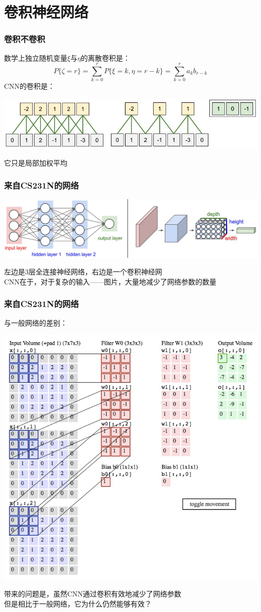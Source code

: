 \documentclass[24pt]{beamer}
\begin{document}
\section{卷积神经网络}
\begin{frame}
\frametitle{卷积不卷积}
数学上独立随机变量$\xi$与$\eta$的离散卷积是：
\[ P\{\zeta = r\} = \sum_{k = 0}^r P\{ \xi=k, \eta=r-k \} = \sum_{k = 0}^r a_k b_{r - k} \]
CNN的卷积是：
\begin{center}
\includegraphics[width=0.8\linewidth]{fig09.jpg}
\end{center}
它只是局部加权平均
\end{frame}
\begin{frame}
\frametitle{来自CS231N的网络}
\begin{center}
\includegraphics[width=0.9\linewidth]{fig10.jpg}
\end{center}
左边是3层全连接神经网络，右边是一个卷积神经网\\
CNN在于，对于复杂的输入——图片，大量地减少了网络参数的数量
\end{frame}
\begin{frame}
\frametitle{来自CS231N的网络}
与一般网络的差别：
\begin{center}
\includegraphics[width=0.47\linewidth]{fig11.jpg}
\end{center}
带来的问题是，虽然CNN通过卷积有效地减少了网络参数\\
但是相比于一般网络，它为什么仍然能够有效？
\end{frame}
\end{document}
